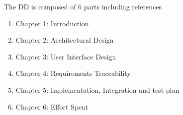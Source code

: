 \qquad The DD is composed of 6 parts including references
\begin{enumerate}
\item Chapter 1: Introduction
\item Chapter 2: Architectural Design
\item Chapter 3: User Interface Design
\item Chapter 4: Requirements Traceability
\item Chapter 5: Implementation, Integration and test plan
\item Chapter 6: Effort Spent
\end{enumerate}